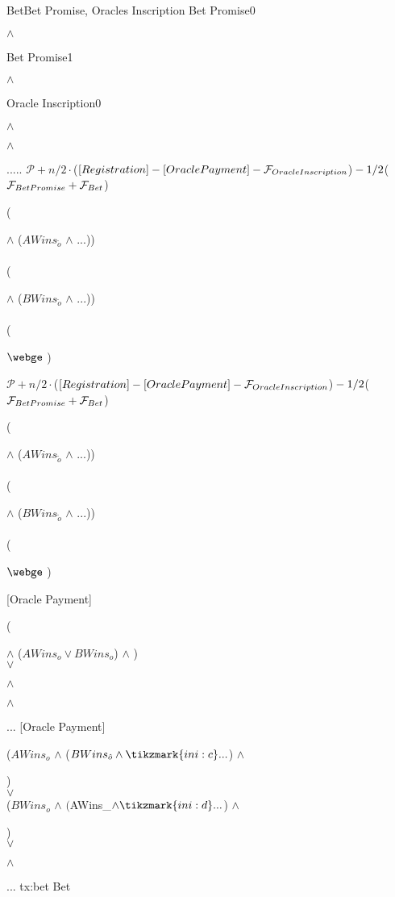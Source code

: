 \transaction
    {Bet}{Bet Promise, Oracles Inscription}
    {Bet Promise}{0}{\signature{A} $\wedge$ \signature{B}}
    {Bet Promise}{1}{\signature{A} $\wedge$ \signature{B}}
    {Oracle Inscription}{0}
        {\signature{A} $\wedge$ \signature{B} $\wedge$ \signature{O}}
        {...}{..}{}
    \stopinputs
    {$\mathcal{P} + n/2 \cdot $($[Registration] \\
            - [Oracle Payment] \\
            - \mathcal{F}_{Oracle Inscription}$)$ \\
            - 1/2 $($\mathcal{F}_{Bet Promise} + \mathcal{F}_{Bet}$)}
        {(\signature{A} $\wedge$ ($AWins_{\tilde{o}}$ $\wedge$ ...)) \\
                          \vee \\
         (\signature{B} $\wedge$ ($BWins_{\tilde{o}}$ $\wedge$ ...)) \\
                                    \vee \\
         (\signature{A} $\webge$ )}
    {$\mathcal{P} + n/2 \cdot $($[Registration] \\
            - [Oracle Payment] \\
            - \mathcal{F}_{Oracle Inscription}$)$ \\
            - 1/2 $($\mathcal{F}_{Bet Promise} + \mathcal{F}_{Bet}$)}
        {(\signature{A} $\wedge$ ($AWins_{\tilde{o}}$ $\wedge$ ...)) \\
                          \vee \\
         (\signature{B} $\wedge$ ($BWins_{\tilde{o}}$ $\wedge$ ...)) \\
                                    \vee \\
         (\signature{B} $\webge$ )}
    {[Oracle Payment]}{(\signature{o} $\wedge$ ($AWins_o \vee BWins_o$) %
                       $\wedge$ ) \\
                       $\vee$  \\
                       \signature{A} $\wedge$ \signature{B} $\wedge$ %
                       }
    {...}{}
    {[Oracle Payment]}{($AWins_o$ $\wedge$ ($BWins_{\hat{o}} \wedge %
                        \tikzmark{ini:c}...$) $\wedge$ \signature{B}) \\
                       $\vee$ \\
                       ($BWins_o$ $\wedge$ $($AWins_{}$ %
                        \wedge \tikzmark{ini:d} ...$) $\wedge$ \signature{A}) \\
                       $\vee$ \\
                        \signature{o} $\wedge$ }
    {...}{}
    \stopoutputs
    {tx:bet}
    {Bet}

